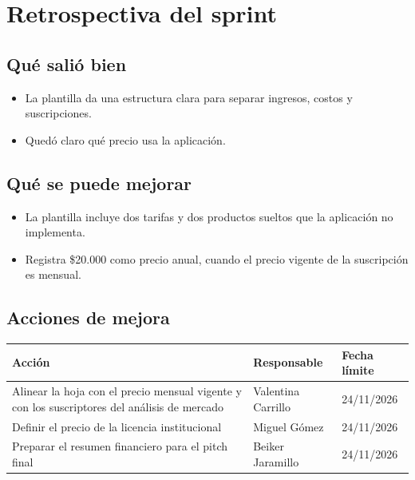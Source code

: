 \documentclass[11pt,a4paper]{article}
\begin{document}
\section{Retrospectiva del sprint}

\subsection{Qué salió bien}
\begin{itemize}[leftmargin=1.5em]
  \item {La plantilla da una estructura clara para separar ingresos, costos y suscripciones.}
  \item {Quedó claro qué precio usa la aplicación.}
\end{itemize}

\subsection{Qué se puede mejorar}
\begin{itemize}[leftmargin=1.5em]
  \item {La plantilla incluye dos tarifas y dos productos sueltos que la aplicación no implementa.}
  \item {Registra \$20.000 como precio anual, cuando el precio vigente de la suscripción es mensual.}
\end{itemize}

\subsection{Acciones de mejora}
\begin{tabularx}{\textwidth}{X l l}
  \toprule
  \textbf{Acción} & \textbf{Responsable} & \textbf{Fecha límite} \\
  \midrule
  Alinear la hoja con el precio mensual vigente y con los suscriptores del análisis de mercado & Valentina Carrillo & 24/11/2026 \\
  Definir el precio de la licencia institucional & Miguel Gómez & 24/11/2026 \\
  Preparar el resumen financiero para el pitch final & Beiker Jaramillo & 24/11/2026 \\
  \bottomrule
\end{tabularx}
\end{document}
